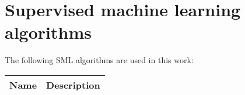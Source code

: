 \appendix
%

\chapter{Supervised machine learning algorithms}

The following SML algorithms are used in this work:

\begin{tabularx}{\textwidth}{l X}
Name & Description\\
\hline




\end{tabularx}
